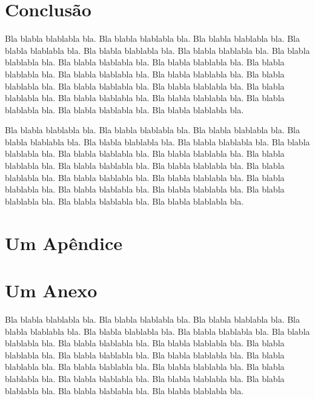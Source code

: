 \documentclass[tese,capa]{texufpel}
\begin{document}
\chapter{Conclusão}

Bla blabla blablabla bla.  Bla blabla blablabla bla.  Bla blabla
blablabla bla.  Bla blabla blablabla bla.  Bla blabla blablabla bla.
Bla blabla blablabla bla.  Bla blabla blablabla bla.  Bla blabla
blablabla bla.  Bla blabla blablabla bla.  Bla blabla blablabla bla.
Bla blabla blablabla bla.  Bla blabla blablabla bla.  Bla blabla
blablabla bla.  Bla blabla blablabla bla.  Bla blabla blablabla bla.
Bla blabla blablabla bla.  Bla blabla blablabla bla.  Bla blabla
blablabla bla.  Bla blabla blablabla bla.  Bla blabla blablabla bla.
Bla blabla blablabla bla.

Bla blabla blablabla bla.  Bla blabla blablabla bla.  Bla blabla
blablabla bla.  Bla blabla blablabla bla.  Bla blabla blablabla bla.
Bla blabla blablabla bla.  Bla blabla blablabla bla.  Bla blabla
blablabla bla.  Bla blabla blablabla bla.  Bla blabla blablabla bla.
Bla blabla blablabla bla.  Bla blabla blablabla bla.  Bla blabla
blablabla bla.  Bla blabla blablabla bla.  Bla blabla blablabla bla.
Bla blabla blablabla bla.  Bla blabla blablabla bla.  Bla blabla
blablabla bla.  Bla blabla blablabla bla.  Bla blabla blablabla bla.
Bla blabla blablabla bla.



 

\apendices
\chapter{Um Apêndice}

\anexos
\chapter{Um Anexo}

Bla blabla blablabla bla.  Bla blabla blablabla bla.  Bla blabla
blablabla bla.  Bla blabla blablabla bla.  Bla blabla blablabla bla.
Bla blabla blablabla bla.  Bla blabla blablabla bla.  Bla blabla
blablabla bla.  Bla blabla blablabla bla.  Bla blabla blablabla bla.
Bla blabla blablabla bla.  Bla blabla blablabla bla.  Bla blabla
blablabla bla.  Bla blabla blablabla bla.  Bla blabla blablabla bla.
Bla blabla blablabla bla.  Bla blabla blablabla bla.  Bla blabla
blablabla bla.  Bla blabla blablabla bla.  Bla blabla blablabla bla.
Bla blabla blablabla bla.
\end{document}
